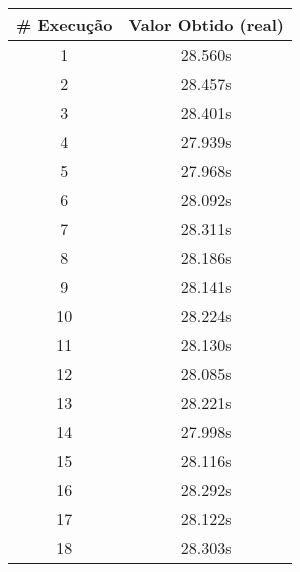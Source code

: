 \documentclass[11pt]{article}
\begin{document}
\begin{table}[!h]
\begin{center}
\begin{minipage}{0.48\textwidth}
\begin{tabular}{| c | c |}
			\hline
				\textbf{\# Execução} &  \textbf{Valor Obtido (real)} \\ \hline
				1 & 28.560s \\ \hline
				2 & 28.457s \\ \hline
				3 & 28.401s \\ \hline
				4 & 27.939s \\ \hline
				5 & 27.968s \\ \hline
				6 & 28.092s \\ \hline
				7 & 28.311s \\ \hline
				8 & 28.186s \\ \hline
				9 & 28.141s \\ \hline
				10 & 28.224s \\ \hline
				11 & 28.130s \\ \hline
				12 & 28.085s \\ \hline
				13 & 28.221s \\ \hline
				14 & 27.998s \\ \hline
				15 & 28.116s \\ \hline
				16 & 28.292s \\ \hline
				17 & 28.122s \\ \hline
				18 & 28.303s \\ \hline
			\end{tabular}
		\end{minipage}
	\end{center}
\end{table}
\end{document}
